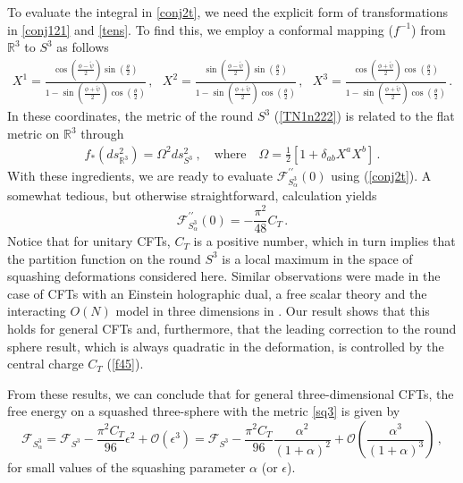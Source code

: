 \documentclass[12pt]{article}
\numberwithin{equation}{section}
\newcommand{\req}[1]{(\ref{#1})} %
\newcommand{\labell}[1]{\label{#1}}
\newcommand{\ssc}{\scriptscriptstyle}
\newcommand{\ctt}{C_{\ssc T}}
\begin{document}
To evaluate the integral in \eqref{conj2t}, we need the explicit form of transformations in \eqref{conj121} and \eqref{tens}. To find this, we employ a conformal mapping ($f^{-1}$) from $\mathbb{R}^3$ to $S^3$ as follows
%
\begin{align}
X^1=  \frac{\cos\left(\frac{\phi-\tilde{\psi}}{2}\right)\sin\left(\frac{\theta}{2}\right)}{1-\sin\left(\frac{\phi+\tilde{\psi}}{2}\right)\cos\left(\frac{\theta}{2}\right)}\, ,~~~   
X^2=  \frac{\sin\left(\frac{\phi-\tilde{\psi}}{2}\right)\sin\left(\frac{\theta}{2}\right)}{1-\sin\left(\frac{\phi+\tilde{\psi}}{2}\right)\cos\left(\frac{\theta}{2}\right)}\, , ~~~
X^3= \frac{\cos\left(\frac{\phi+\tilde{\psi}}{2}\right)\cos\left(\frac{\theta}{2}\right)}{1-\sin\left(\frac{\phi+\tilde{\psi}}{2}\right)\cos\left(\frac{\theta}{2}\right)}\, .
\end{align}
%
In these coordinates, the metric of the round $S^3$ \req{TN1n222} is related to the flat metric on $\mathbb{R}^3$ through
%
\begin{align}\label{3sphmet}
f_*(ds^2_{\mathbb{R}^3})=\Omega^{2}ds^2 _{S^3}\ , \quad \text{where} \quad 
\Omega=\frac{1}{2}\left[1+\delta_{ab}X^aX^b\right]\, .
\end{align}
%
With these ingredients, we are ready to evaluate $\mathcal{F}^{\prime\prime}_{S^{3}_{\alpha}}(0)$ using \req{conj2t}. A somewhat tedious, but otherwise straightforward, calculation yields 
%
\begin{equation}\labell{f45}
\mathcal{F}^{\prime\prime}_{S^{3}_{\alpha}}(0)=-\frac{\pi^2}{48}\ctt\, .
\end{equation}
%
Notice that for unitary CFTs, $\ctt$ is a positive number, which in turn implies that the partition function on the round $S^{3}$ is a local maximum in the space of squashing deformations considered here. Similar observations were made in the case of CFTs with an Einstein holographic dual, a free scalar theory and the interacting $O(N)$ model in three dimensions in \cite{Hartnoll:2005yc,Anninos:2012ft}. Our result shows that this holds for general CFTs and, furthermore, that the leading correction to the round sphere result, which is always quadratic in the deformation, is controlled by the central charge $\ctt$ \req{f45}. 


From these results, we can conclude that for general three-dimensional CFTs, the free energy on a squashed three-sphere with the metric \eqref{sq3} is given by
%
\begin{equation}\labell{f48}
\mathcal{F}_{S^{3}_{\alpha}}=\mathcal{F}_{S^{3}}-\frac{\pi^2\ctt}{96}\epsilon^2+\mathcal{O}\left(\epsilon^3\right)=\mathcal{F}_{S^{3}}-\frac{\pi^2\ctt}{96}\frac{\alpha^2}{(1+\alpha)^2}+\mathcal{O}\left(\frac{\alpha^3}{(1+\alpha)^3}\right)\, ,
\end{equation}
%
for small values of the squashing parameter $\alpha$ (or $\epsilon$). 
\end{document}
